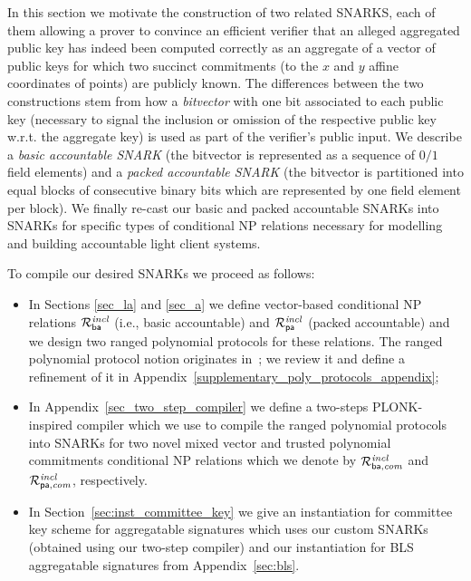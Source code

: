 \label{sec:snarks}

In this section we motivate the construction of two related SNARKS, each of them allowing a prover to convince an 
efficient verifier that an alleged aggregated public key has indeed been computed correctly as an aggregate 
of a vector of public keys for which two succinct commitments (to the $x$ and $y$ affine coordinates of points) 
are publicly known. The differences between the two constructions stem from how a \emph{bitvector} with one bit associated to each public key 
(necessary to signal the inclusion or omission of the respective public key w.r.t. the aggregate key) 
is used as part of the verifier's public input. We describe a 
\emph{basic accountable SNARK} (the bitvector is represented as a sequence of $0/1$ field elements) and a \emph{packed accountable SNARK} (the bitvector is 
partitioned into equal blocks of consecutive binary bits which are represented by one field element per block). 
We finally re-cast our basic and packed accountable SNARKs into SNARKs for specific types of conditional NP relations necessary for modelling and 
building accountable light client systems. %

\noindent To compile our desired SNARKs we proceed as follows:
\begin{itemize}
\item In Sections \ref{sec_la} and \ref{sec_a} we define vector-based conditional NP relations $\mathcal{R}^{\mathit{incl}}_{\mathsf{ba}}$ (i.e., basic accountable) and $\mathcal{R}^{\mathit{incl}}_{\mathsf{pa}}$ (packed accountable) and we design two ranged polynomial protocols for these relations. The ranged polynomial protocol notion originates in~\cite{plonk}; 
we review it and define a refinement of it in Appendix~\ref{supplementary_poly_protocols_appendix};  
\item In Appendix~\ref{sec_two_step_compiler} we define a two-steps PLONK-inspired compiler which we use to compile the ranged polynomial protocols into 
SNARKs for two novel mixed vector and trusted polynomial commitments conditional NP relations which we denote by 
$\mathcal{R}^{\mathit{incl}}_{\mathsf{ba},\mathit{com}}$ and $\mathcal{R}^{\mathit{incl}}_{\mathsf{pa},\mathit{com}}$, respectively. 
\item In Section~\ref{sec:inst_committee_key} we give an instantiation for committee key scheme for aggregatable signatures which uses our custom SNARKs 
(obtained using our two-step compiler) and our instantiation for BLS aggregatable signatures from Appendix~\ref{sec:bls}. 
\end{itemize}

